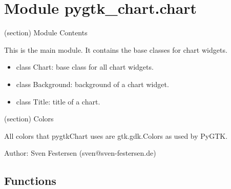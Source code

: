 %
%
%


\section{Module pygtk\_chart.chart}

    \label{pygtk_chart:chart}
(section) Module Contents

  This is the main module. It contains the base classes for chart widgets.

  \begin{itemize}
  \setlength{\parskip}{0.6ex}
    \item class Chart: base class for all chart widgets.

    \item class Background: background of a chart widget.

    \item class Title: title of a chart.

  \end{itemize}

  (section) Colors

    All colors that pygtkChart uses are gtk.gdk.Colors as used by PyGTK.

    Author: Sven Festersen (sven@sven-festersen.de)



  \subsection{Functions}

    \label{pygtk_chart:chart:init_sensitive_areas}

    \vspace{0.5ex}

